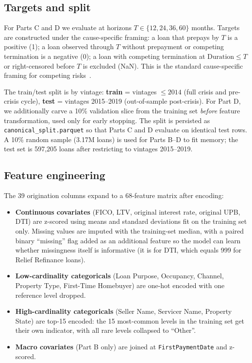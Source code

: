 \documentclass[11pt,a4paper]{article}
\begin{document}
\subsection{Targets and split}

For Parts C and D we evaluate at horizons $T \in \{12, 24, 36, 60\}$ months. Targets are constructed under the cause-specific framing: a loan that prepays by $T$ is a positive (1); a loan observed through $T$ without prepayment or competing termination is a negative (0); a loan with competing termination at $\text{Duration} \leq T$ or right-censored before $T$ is excluded (NaN). This is the standard cause-specific framing for competing risks~\cite{kalbfleischprentice}.

The train/test split is by vintage: \textbf{train} = vintages $\leq 2014$ (full crisis and pre-crisis cycle), \textbf{test} = vintages 2015--2019 (out-of-sample post-crisis). For Part D, we additionally carve a 10\% validation slice from the training set \emph{before} feature transformation, used only for early stopping. The split is persisted as \texttt{canonical\_split.parquet} so that Parts C and D evaluate on identical test rows. A 10\% random sample (3.17M loans) is used for Parts B--D to fit memory; the test set is 597{,}205 loans after restricting to vintages 2015--2019.

\subsection{Feature engineering}

The 39 origination columns expand to a 68-feature matrix after encoding:

\begin{itemize}[leftmargin=1.2em,itemsep=2pt,topsep=2pt]
  \item \textbf{Continuous covariates} (FICO, LTV, original interest rate, original UPB, DTI) are z-scored using means and standard deviations fit on the training set only. Missing values are imputed with the training-set median, with a paired binary ``missing'' flag added as an additional feature so the model can learn whether missingness itself is informative (it is for DTI, which equals 999 for Relief Refinance loans).
  \item \textbf{Low-cardinality categoricals} (Loan Purpose, Occupancy, Channel, Property Type, First-Time Homebuyer) are one-hot encoded with one reference level dropped.
  \item \textbf{High-cardinality categoricals} (Seller Name, Servicer Name, Property State) are top-15 encoded: the 15 most-common levels in the training set get their own indicator, with all rare levels collapsed to ``Other''.
  \item \textbf{Macro covariates} (Part B only) are joined at \texttt{FirstPaymentDate} and z-scored.
\end{itemize}
\end{document}
